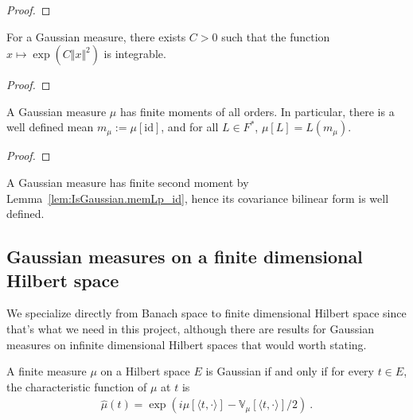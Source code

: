 \begin{proof}\leanok

\end{proof}


\begin{theorem}\label{thm:IsGaussian.exists_integrable_exp_sq}
  \mathlibok
For a Gaussian measure, there exists $C > 0$ such that the function $x \mapsto \exp (C \Vert x \Vert ^ 2)$ is integrable.
\end{theorem}

\begin{proof}\leanok

\end{proof}


\begin{lemma}\label{lem:IsGaussian.memLp_id}
  \mathlibok
A Gaussian measure $\mu$ has finite moments of all orders.
In particular, there is a well defined mean $m_\mu := \mu[\mathrm{id}]$, and for all $L \in F^*$, $\mu[L] = L(m_\mu)$.
\end{lemma}

\begin{proof}\leanok

\end{proof}

A Gaussian measure has finite second moment by Lemma~\ref{lem:IsGaussian.memLp_id}, hence its covariance bilinear form is well defined.


\subsection{Gaussian measures on a finite dimensional Hilbert space}

We specialize directly from Banach space to finite dimensional Hilbert space since that's what we need in this project, although there are results for Gaussian measures on infinite dimensional Hilbert spaces that would worth stating.

\begin{lemma}\label{lem:isGaussian_iff_charFun_eq}
  \leanok
A finite measure $\mu$ on a Hilbert space $E$ is Gaussian if and only if for every $t \in E$, the characteristic function of $\mu$ at $t$ is
\begin{align*}
  \hat{\mu}(t) =  \exp\left(i \mu[\langle t, \cdot \rangle] - \mathbb{V}_\mu[\langle t, \cdot \rangle] / 2\right) \: .
\end{align*}
\end{lemma}

